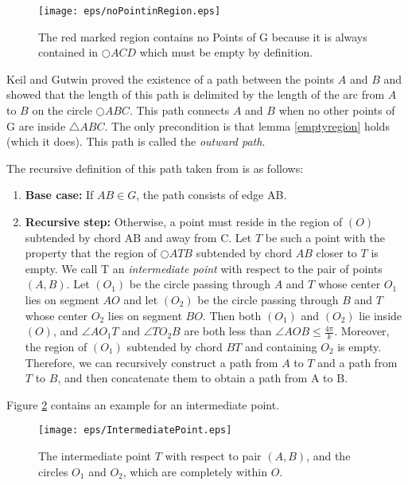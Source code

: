 \begin{figure}[h!]
\centering
\texttt{[image: eps/noPointinRegion.eps]}
\caption{The red marked region contains no Points of G because it is always contained in $\bigcirc{ACD} $ which must be empty by definition.}
\label{fig:empty_region}
\end{figure}

Keil and Gutwin \cite{keil} proved the existence of a path between the points $A $ and $B $ and showed that the length of this path is delimited by the length of the arc from $A $ to $B $ on the circle $\bigcirc{ABC} $.
This path connects $A $ and $B $ when no other points of G are inside $\triangle{ABC} $.
The only precondition is that lemma \ref{emptyregion} holds (which it does).
This path is called the \emph{outward path}.

The recursive definition of this path taken from \cite{kanj} is as follows:
\begin{enumerate}
\item \textbf{Base case:} If $AB \in G $, the path consists of edge AB.
\item \textbf{Recursive step:} Otherwise, a point must reside in the region of $(O) $ subtended by chord AB and away from C. 
Let $T $ be such a point with the property that the region of $\bigcirc{ATB} $ subtended by chord $AB $ closer to $T $ is empty. 
We call T an \emph{intermediate point} with respect to the pair of points $(A, B) $.
Let $(O_1) $ be the circle passing through $A $ and $T $ whose center $O_1 $ lies on segment $AO $  and let $(O_2) $ be the circle passing through $B $ and $T $ whose center $O_2 $ lies on segment $BO $.
Then both $(O_1) $ and $(O_2) $ lie inside $(O) $, and $\angle{AO_1T} $ and $\angle{TO_2B} $ are both less than $\angle{AOB} \leq \frac{4\pi}{k} $.
Moreover, the region of $(O_1) $ subtended by chord $BT $ and containing $O_2 $ is empty. Therefore, we can recursively construct a path from $A $ to $T $ and a path from $T $ to $B $, and then concatenate them to obtain a path from A to B.  
\end{enumerate}
Figure \ref{fig:intermediate_point} contains an example for an intermediate point.


\begin{figure}[h!]
\centering
\texttt{[image: eps/IntermediatePoint.eps]}
\caption{The intermediate point $T $ with respect to pair $(A,B) $, and the circles $O_1 $ and $O_2 $, which are completely within $O $. }
\label{fig:intermediate_point}
\end{figure}


